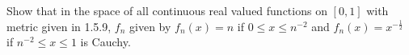 Show that in the space of all continuous real valued functions on $[0,1]$ with metric given in 1.5.9,
$f_n$ given by $f_n(x)=n$ if $0\leq x\leq n^{-2}$ and $f_n(x)=x^{-\frac12}$ if $n^{-2}\leq x\leq 1$ is
Cauchy.\\